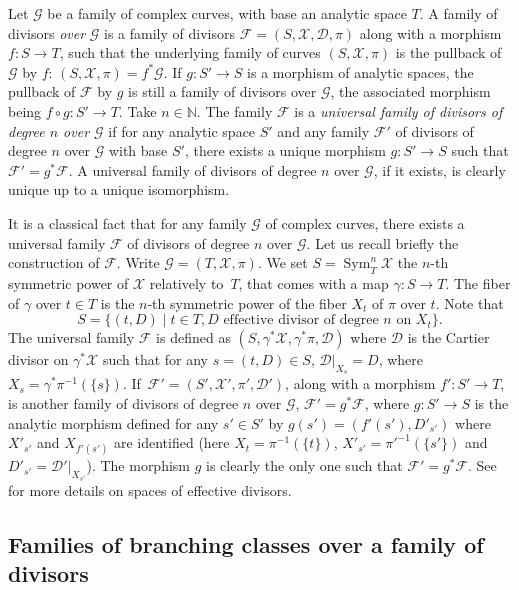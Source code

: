 \documentclass[10pt]{amsart}
\newcommand{\N}{\mathbb N}
\DeclareMathOperator{\Sym}{Sym}
\theoremstyle{definition}
\theoremstyle{plain}
\begin{document}
Let $\mathcal G$ be a family of complex curves, with base an analytic space $T$.
A family of divisors \emph{over} $\mathcal G$ is a family of divisors $\mathcal F = (S, \mathcal X, \mathcal D, \pi)$ along with a morphism $f: S \to T$, such that the underlying family of curves $(S, \mathcal X, \pi)$ is the pullback of $\mathcal G$ by $f$: $(S, \mathcal X, \pi) = f^*\mathcal G$.
If $g: S' \to S$ is a morphism of analytic spaces, the pullback of $\mathcal F$ by $g$ is still a family of divisors over $\mathcal G$, the associated morphism being $f \circ g: S' \to T$.
Take $n \in \N$.
The family $\mathcal F$ is a \emph{universal family of divisors of degree $n$ over $\mathcal G$} if for any analytic space $S'$ and any family $\mathcal F'$ of divisors of degree $n$ over $\mathcal G$ with base $S'$, there exists a unique morphism $g: S' \to S$ such that $\mathcal F' = g^*\mathcal F$.
A universal family of divisors of degree $n$ over $\mathcal G$, if it exists, is clearly unique up to a unique isomorphism.

It is a classical fact that for any family $\mathcal G$ of complex curves, there exists a universal family $\mathcal F$ of divisors of degree $n$ over $\mathcal G$.
Let us recall briefly the construction of $\mathcal F$.
Write $\mathcal G = (T, \mathcal X, \pi)$.
We set $S = \Sym^n_T \mathcal X$ the $n$-th symmetric power of $\mathcal X$ relatively to~$T$, that comes with a map $\gamma: S \to T$.
The fiber of $\gamma$ over $t \in T$ is the $n$-th symmetric power of the fiber $X_t$ of $\pi$ over $t$.
Note that
\[
S = \{(t, D)\mid t \in T, D \text{ effective divisor of degree $n$ on $X_t$}\}.
\]
The universal family $\mathcal F$ is defined as $(S, \gamma^*\mathcal X, \gamma^*\pi, \mathcal D)$ where $\mathcal D$ is the Cartier divisor on $\gamma^*\mathcal X$ such that for any $s = (t, D) \in S$, $\mathcal D|_{X_s} = D$, where $X_s = \gamma^*\pi^{-1}(\{s\})$.
If~$\mathcal F' = (S', \mathcal X', \pi', \mathcal D')$, along with a morphism $f': S' \to T$, is another family of divisors of degree $n$ over $\mathcal G$, $\mathcal F' = g^*\mathcal F$, where $g: S' \to S$ is the analytic morphism defined for any $s' \in S'$ by $g(s') = \left(f'(s'), D'_{s'}\right)$ where $X'_{s'}$ and $X_{f'(s')}$ are identified (here $X_t = \pi^{-1}(\{t\})$, $X'_{s'} = \pi'^{-1}(\{s'\})$ and $D'_{s'} = \mathcal D'|_{X_{s'}}$).
The morphism $g$ is clearly the only one such that $\mathcal F' = g^*\mathcal F$.
See \cite{barlet-magnusson} for more details on spaces of effective divisors.

\subsection{Families of branching classes over a family of divisors}\label{subsection_families_branching_classes}
\end{document}

